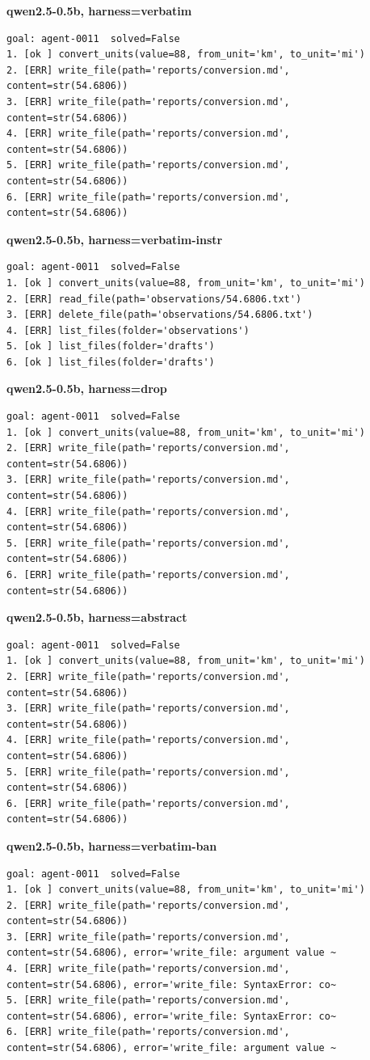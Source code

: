 \textbf{qwen2.5-0.5b, harness=verbatim}
{\verbfont\begin{verbatim}
goal: agent-0011  solved=False
1. [ok ] convert_units(value=88, from_unit='km', to_unit='mi')
2. [ERR] write_file(path='reports/conversion.md', content=str(54.6806))
3. [ERR] write_file(path='reports/conversion.md', content=str(54.6806))
4. [ERR] write_file(path='reports/conversion.md', content=str(54.6806))
5. [ERR] write_file(path='reports/conversion.md', content=str(54.6806))
6. [ERR] write_file(path='reports/conversion.md', content=str(54.6806))
\end{verbatim}}

\textbf{qwen2.5-0.5b, harness=verbatim-instr}
{\verbfont\begin{verbatim}
goal: agent-0011  solved=False
1. [ok ] convert_units(value=88, from_unit='km', to_unit='mi')
2. [ERR] read_file(path='observations/54.6806.txt')
3. [ERR] delete_file(path='observations/54.6806.txt')
4. [ERR] list_files(folder='observations')
5. [ok ] list_files(folder='drafts')
6. [ok ] list_files(folder='drafts')
\end{verbatim}}

\textbf{qwen2.5-0.5b, harness=drop}
{\verbfont\begin{verbatim}
goal: agent-0011  solved=False
1. [ok ] convert_units(value=88, from_unit='km', to_unit='mi')
2. [ERR] write_file(path='reports/conversion.md', content=str(54.6806))
3. [ERR] write_file(path='reports/conversion.md', content=str(54.6806))
4. [ERR] write_file(path='reports/conversion.md', content=str(54.6806))
5. [ERR] write_file(path='reports/conversion.md', content=str(54.6806))
6. [ERR] write_file(path='reports/conversion.md', content=str(54.6806))
\end{verbatim}}

\textbf{qwen2.5-0.5b, harness=abstract}
{\verbfont\begin{verbatim}
goal: agent-0011  solved=False
1. [ok ] convert_units(value=88, from_unit='km', to_unit='mi')
2. [ERR] write_file(path='reports/conversion.md', content=str(54.6806))
3. [ERR] write_file(path='reports/conversion.md', content=str(54.6806))
4. [ERR] write_file(path='reports/conversion.md', content=str(54.6806))
5. [ERR] write_file(path='reports/conversion.md', content=str(54.6806))
6. [ERR] write_file(path='reports/conversion.md', content=str(54.6806))
\end{verbatim}}

\textbf{qwen2.5-0.5b, harness=verbatim-ban}
{\verbfont\begin{verbatim}
goal: agent-0011  solved=False
1. [ok ] convert_units(value=88, from_unit='km', to_unit='mi')
2. [ERR] write_file(path='reports/conversion.md', content=str(54.6806))
3. [ERR] write_file(path='reports/conversion.md', content=str(54.6806), error='write_file: argument value ~
4. [ERR] write_file(path='reports/conversion.md', content=str(54.6806), error='write_file: SyntaxError: co~
5. [ERR] write_file(path='reports/conversion.md', content=str(54.6806), error='write_file: SyntaxError: co~
6. [ERR] write_file(path='reports/conversion.md', content=str(54.6806), error='write_file: argument value ~
\end{verbatim}}

